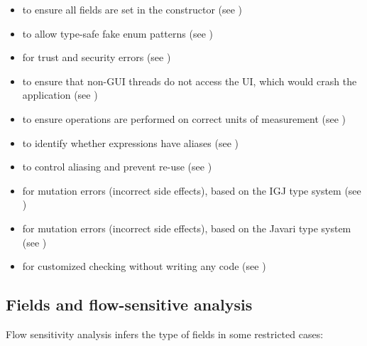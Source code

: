 \begin{itemize}
\item
   to ensure all
  fields are set in the constructor (see
  )
\item
   to allow type-safe fake enum
  patterns (see )
\item
   for trust and security errors
  (see )
\item
   to ensure that non-GUI
  threads do not access the UI, which would crash the application
  (see )
\item
   to ensure operations are
  performed on correct units of measurement
  (see )
\item
   to identify whether
  expressions have aliases (see )
\item
   to control aliasing and prevent
  re-use (see )
\item
   for mutation errors (incorrect
  side effects), based on the IGJ type system (see
  )
\item
   for mutation errors
  (incorrect side effects), based on the Javari type system (see
  )
\item
   for customized checking without
  writing any code (see )
\end{itemize}



\subsection{Fields and flow-sensitive analysis\label{type-refinement-fields}}

Flow sensitivity analysis infers the type of fields in some restricted cases:

